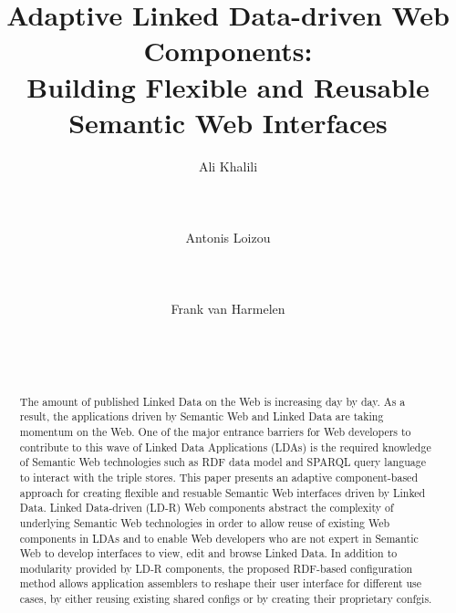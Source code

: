 \documentclass{acm_proc_article-sp}
\begin{document}
\title{Adaptive Linked Data-driven Web Components:\\ Building Flexible and Reusable Semantic Web Interfaces}
\subtitle{}

\author{
\alignauthor
Ali Khalili\\
       \\
       \\
       \\
\alignauthor
Antonis Loizou\\
       \\
       \\
       \\
\alignauthor
Frank van Harmelen\\
       \\
       \\
       \\
}


\maketitle
\begin{abstract}
The amount of published Linked Data on the Web is increasing day by day.
As a result, the applications driven by Semantic Web and Linked Data are taking momentum on the Web.
One of the major entrance barriers for Web developers to contribute to this wave of Linked Data Applications (LDAs) is the required knowledge of Semantic Web technologies such as RDF data model and SPARQL query language to interact with the triple stores.
This paper presents an adaptive component-based approach for creating flexible and resuable Semantic Web interfaces driven by Linked Data.
Linked Data-driven (LD-R) Web components abstract the complexity of underlying Semantic Web technologies in order to allow reuse of existing Web components in LDAs and to enable Web developers who are not expert in Semantic Web to develop interfaces to view, edit and browse Linked Data.
In addition to modularity provided by LD-R components, the proposed RDF-based configuration method allows application assemblers to reshape their user interface for different use cases, by either reusing existing shared configs or by creating their proprietary confgis.

\end{abstract}
\end{document}
